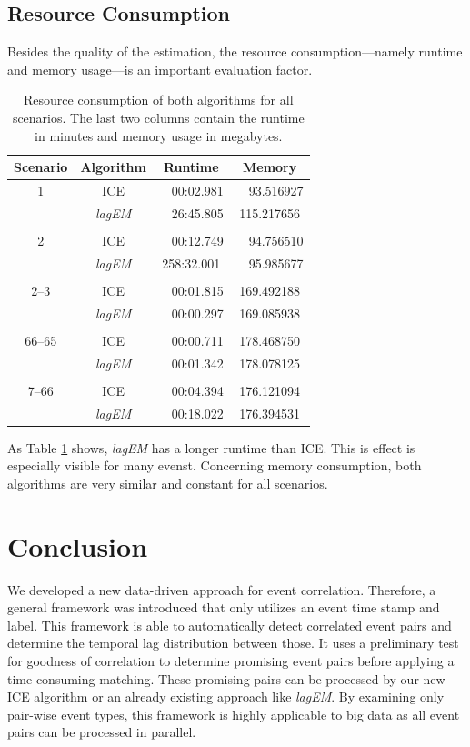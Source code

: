 \documentclass[conference]{IEEEtran}
\theoremstyle{examplestyle}
\begin{document}
\subsection{Resource Consumption}
Besides the quality of the estimation, the resource consumption---namely runtime and memory usage---is an important evaluation factor. 


\begin{table}[!tb]
	\centering
	\begin{tabular}{c c c c}
		\textbf{Scenario} & \textbf{Algorithm} & \textbf{Runtime} & \textbf{Memory} \\
		\hline
		1	& \ac{ICE}				&	~~00:02.981	&	~~93.516927	\\
			& \textit{lagEM}		&	~~26:45.805	&	115.217656	\\
		\\
		2	& \ac{ICE}				&	~~00:12.749	&	~~94.756510	\\
			& \textit{lagEM}		&	258:32.001	&	~~95.985677	\\
		\\
		2--3 & \ac{ICE}				&	~~00:01.815	&	169.492188 \\
			&	\textit{lagEM}		&	~~00:00.297	&	169.085938 \\
		\\
		66--65 & \ac{ICE}			&	~~00:00.711	&	178.468750 \\
			&	\textit{lagEM}		&	~~00:01.342	&	178.078125 \\
		\\
		7--66 & \ac{ICE}			&	~~00:04.394	&	176.121094 \\
			&	\textit{lagEM}		&	~~00:18.022	&	176.394531 \\
	\end{tabular}
	\caption{Resource consumption of both algorithms for all scenarios. The last two columns contain the runtime in minutes and memory usage in megabytes.}
	\label{tbl:resources}
\end{table}



As Table \ref{tbl:resources} shows, \textit{lagEM} has a longer runtime than \ac{ICE}. This is effect is especially visible for many evenst. Concerning memory consumption, both algorithms are very similar and constant for all scenarios.



\section{Conclusion} \label{sec:conc}
We developed a new data-driven approach for event correlation. Therefore, a general framework was introduced that only utilizes an event time stamp and label. This framework is able to automatically detect correlated event pairs and determine the temporal lag distribution between those. It uses a preliminary test for goodness of correlation to determine promising event pairs before applying a time consuming matching. These promising pairs can be processed by our new \ac{ICE} algorithm or an already existing approach like \textit{lagEM}. By examining only pair-wise event types, this framework is highly applicable to big data as all event pairs can be processed in parallel.
\end{document}
